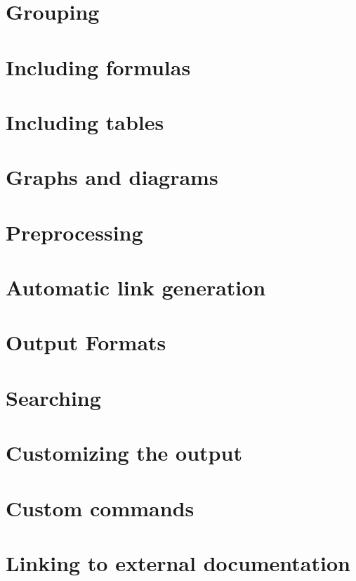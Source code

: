 \documentclass{book}
\newcommand{\+}{\discretionary{\mbox{\scriptsize$\hookleftarrow$}}{}{}}
\begin{document}
\chapter{Grouping}\label{grouping}\hypertarget{grouping}{}
\chapter{Including formulas}\label{formulas}\hypertarget{formulas}{}
\chapter{Including tables}\label{tables}\hypertarget{tables}{}
\chapter{Graphs and diagrams}\label{diagrams}\hypertarget{diagrams}{}
\chapter{Preprocessing}\label{preprocessing}\hypertarget{preprocessing}{}
\chapter{Automatic link generation}\label{autolink}\hypertarget{autolink}{}
\chapter{Output Formats}\label{output}\hypertarget{output}{}
\chapter{Searching}\label{searching}\hypertarget{searching}{}
\chapter{Customizing the output}\label{customize}\hypertarget{customize}{}
\chapter{Custom commands}\label{custcmd}\hypertarget{custcmd}{}
\chapter{Linking to external documentation}\label{external}\hypertarget{external}{}
\end{document}
